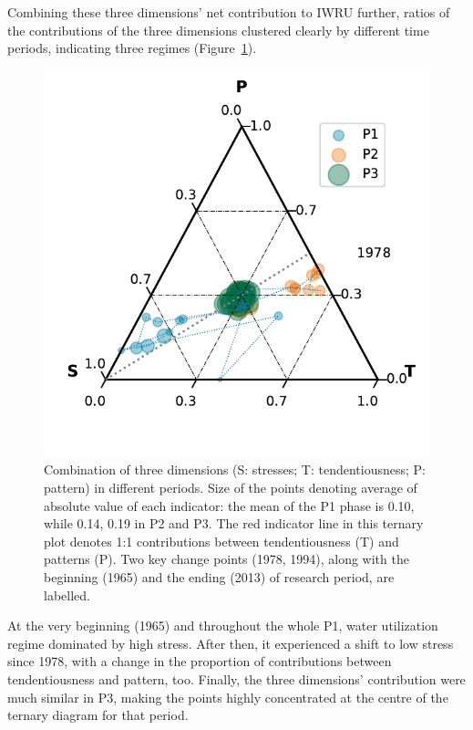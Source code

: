 \documentclass[9pt, twocolumn, twoside, lineno]{pnas-new}
\begin{document}
Combining these three dimensions' net contribution to IWRU further, ratios of the contributions of the three dimensions clustered clearly by different time periods, indicating three regimes (Figure~\ref{fig:phases}).
\begin{figure}%
	\centering
	\includegraphics[width=\linewidth]{../../figures/main_text/phases.pdf}
	\caption{Combination of three dimensions (S: stresses; T: tendentiousness; P: pattern) in different periods. 
	Size of the points denoting average of absolute value of each indicator: the mean of the P1 phase is 0.10, while 0.14, 0.19 in P2 and P3.
	The red indicator line in this ternary plot denotes 1:1 contributions between tendentiousness (T) and patterns (P).
	Two key change points (1978, 1994), along with the beginning (1965) and the ending (2013) of research period, are labelled.}
	\label{fig:phases}
\end{figure}
At the very beginning (1965) and throughout the whole P1, water utilization regime dominated by high stress. After then, it experienced a shift to low stress since 1978, with a change in the proportion of contributions between tendentiousness and pattern, too.
Finally, the three dimensions' contribution were much similar in P3, making the points highly concentrated at the centre of the ternary diagram for that period.
\end{document}

